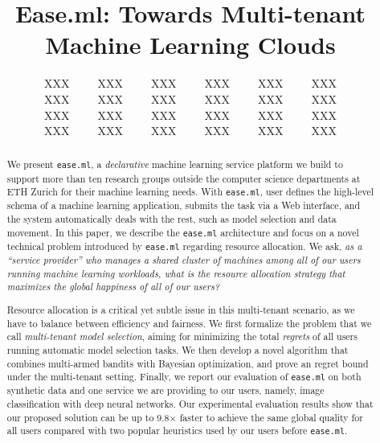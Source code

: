\documentclass[letterpaper]{vldb}
\newcommand{\eml}{\texttt{ease.ml}\xspace}
\begin{document}


\title{Ease.ml: Towards Multi-tenant Machine Learning Clouds}

\author{
XXX~~~~~XXX~~~~~XXX~~~~~XXX~~~~~XXX~~~~~XXX\\
XXX~~~~~XXX~~~~~XXX~~~~~XXX~~~~~XXX~~~~~XXX\\
XXX~~~~~XXX~~~~~XXX~~~~~XXX~~~~~XXX~~~~~XXX\\
XXX~~~~~XXX~~~~~XXX~~~~~XXX~~~~~XXX~~~~~XXX
}

\maketitle

\begin{abstract}
We present \eml, a \emph{declarative} machine learning service platform we build
to support more than ten research groups outside the computer science departments at ETH Zurich 
for their machine learning needs.
With \eml, user defines the high-level 
schema of a machine learning application, submits
the task via a Web interface, and the system automatically deals with the rest, such as model selection and data movement.
In this paper, we describe the \eml architecture and focus on
a novel technical problem introduced by \eml regarding resource allocation.
We ask, {\em as a ``service provider'' who manages a shared cluster of 
machines among all of our users running machine learning workloads, what is the resource
allocation strategy that maximizes the global happiness of all
of our users?}


Resource allocation is a critical yet subtle issue in this multi-tenant scenario, as we 
have to balance between efficiency and fairness.
We first formalize the problem that we call {\em multi-tenant model selection}, 
aiming for minimizing the total {\em regrets} of all users
running automatic model selection tasks.
We then develop a novel algorithm that combines multi-armed bandits with Bayesian 
optimization, and prove an regret bound 
under the multi-tenant setting.
Finally, we report our evaluation of \eml on both synthetic data and one service 
we are providing to our users, namely, 
image classification with deep neural networks.
Our experimental evaluation results show that our proposed solution can 
be up to 9.8$\times$ faster to achieve the same global quality
for all users compared with %
two popular heuristics used by our users before \eml.

\end{abstract} 
\end{document}
